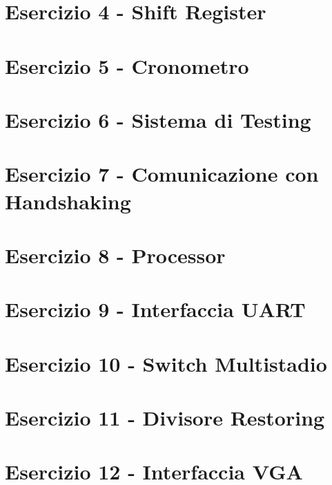 \documentclass[12pt]{article}
\begin{document}
\section{Esercizio 4 - Shift Register}
\newpage
\section{Esercizio 5 - Cronometro}
\newpage
\section{Esercizio 6 - Sistema di Testing}
\newpage
\section{Esercizio 7 - Comunicazione con Handshaking}
\newpage
\section{Esercizio 8 - Processor}
\newpage
\section{Esercizio 9 - Interfaccia UART}
\newpage
\section{Esercizio 10 - Switch Multistadio}
\newpage
\section{Esercizio 11 - Divisore Restoring}
\newpage
\section{Esercizio 12 - Interfaccia VGA}

\newpage
\listoffigures
\end{document}
